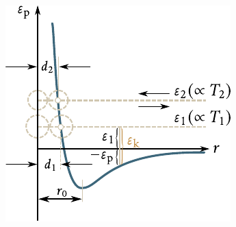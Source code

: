 \begin{figure}[!htb]
	\begin{center}
		\includegraphics[scale=1]{figures/ch_16/fig_16_3.pdf}
		\caption[]{}
		\label{fig:16_3}
	\end{center}
\end{figure}

